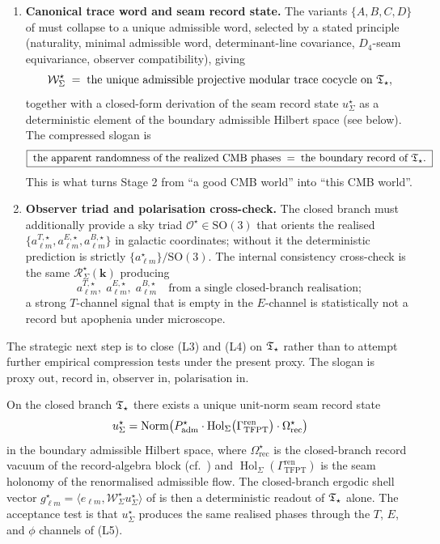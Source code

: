 \begin{remark}
\begin{enumerate}[label=(L\arabic*),leftmargin=2.4em,topsep=3pt,itemsep=2pt]
\item \textbf{Canonical trace word and seam record state.} The variants $\{A,B,C,D\}$ of
 must collapse to a unique admissible word, selected by a stated
principle (naturality, minimal admissible word, determinant-line covariance,
$D_4$-seam equivariance, observer compatibility), giving
\[
\mathcal W_\Sigma^\star\;=\;\text{the unique admissible projective modular trace cocycle on }\mathfrak T_{\star},
\]
together with a closed-form derivation of the seam record state $u_\Sigma^\star$ as a
deterministic element of the boundary admissible Hilbert space (see
 below). The compressed slogan is
\[
\boxed{\;\text{the apparent randomness of the realized CMB phases}\;=\;\text{the boundary record of }\mathfrak T_{\star}.\;}
\]
This is what turns Stage 2 from ``a good CMB world'' into ``this CMB world''.

\item \textbf{Observer triad and polarisation cross-check.} The closed branch must additionally
provide a sky triad $\mathcal O^\star\in\mathrm{SO}(3)$ that orients the realised
$\{a_{\ell m}^{T,\star},a_{\ell m}^{E,\star},a_{\ell m}^{B,\star}\}$ in galactic coordinates;
without it the deterministic prediction is strictly $\{a_{\ell m}^\star\}/\mathrm{SO}(3)$. The
internal consistency cross-check is the same $\mathcal R_\Sigma^\star(\mathbf k)$ producing
\[
a_{\ell m}^{T,\star},\;
a_{\ell m}^{E,\star},\;
a_{\ell m}^{B,\star}
\quad\text{from a single closed-branch realisation};
\]
a strong $T$-channel signal that is empty in the $E$-channel is statistically not a record but
apophenia under microscope.
\end{enumerate}
The strategic next step is to close (L3) and (L4) on $\mathfrak T_{\star}$ rather than to attempt further
empirical compression tests under the present proxy. The slogan is
\(\text{proxy out, record in, observer in, polarisation in.}\)
\end{remark}

\begin{conjecture}
\label{conj:seam-record-state}
On the closed branch $\mathfrak T_{\star}$ there exists a unique unit-norm seam record state
\[
u_\Sigma^\star
=
\operatorname{Norm}\bigl(
P_{\mathrm{adm}}^\star\cdot
\operatorname{Hol}_\Sigma\bigl(\Gamma_{\mathrm{TFPT}}^{\mathrm{ren}}\bigr)\cdot
\Omega_{\mathrm{rec}}^\star
\bigr)
\]
in the boundary admissible Hilbert space, where $\Omega_{\mathrm{rec}}^\star$ is the closed-branch
record vacuum of the record-algebra block (cf.\ ) and
$\operatorname{Hol}_\Sigma(\Gamma_{\mathrm{TFPT}}^{\mathrm{ren}})$ is the seam holonomy of the
renormalised admissible flow. The closed-branch ergodic shell vector
$g_{\ell m}^\star=\langle e_{\ell m},\mathcal W_\Sigma^\star u_\Sigma^\star\rangle$ of
 is then a deterministic readout of $\mathfrak T_{\star}$ alone.
The acceptance test is that $u_\Sigma^\star$ produces the same realised phases through the
$T$, $E$, and $\phi$ channels of (L5).
\end{conjecture}

